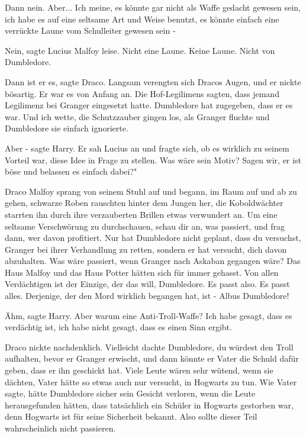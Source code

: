 \glqq Dann nein. Aber... Ich meine, es könnte gar nicht als Waffe gedacht
gewesen sein, ich habe es auf eine seltsame Art und Weise benutzt, es könnte
einfach eine verrückte Laune vom Schulleiter gewesen sein -\grqq{}

\glqq Nein\grqq{}, sagte Lucius Malfoy leise. \glqq Nicht eine Laune. Keine
Laune. Nicht von Dumbledore.\grqq{}

\glqq Dann ist er es\grqq{}, sagte Draco. Langsam verengten sich Dracos Augen,
und er nickte bösartig. \glqq Er war es von Anfang an. Die Hof-Legilimens
sagten, dass jemand Legilimenz bei Granger eingesetzt hatte. Dumbledore hat
zugegeben, dass er es war. Und ich wette, die Schutzzauber gingen los, als
Granger fluchte und Dumbledore sie einfach ignorierte.\grqq{}

\glqq Aber -\grqq{} sagte Harry. Er sah Lucius an und fragte sich, ob es
wirklich zu seinem Vorteil war, diese Idee in Frage zu stellen. \glqq Was wäre
sein Motiv? Sagen wir, er ist böse und belassen es einfach dabei?"

Draco Malfoy sprang von seinem Stuhl auf und begann, im Raum auf und ab zu
gehen, schwarze Roben rauschten hinter dem Jungen her, die Koboldwächter
starrten ihn durch ihre verzauberten Brillen etwas verwundert an. \glqq Um eine
seltsame Verschwörung zu durchschauen, schau dir an, was passiert, und frag
dann, wer davon profitiert. Nur hat Dumbledore nicht geplant, dass du versuchst,
Granger bei ihrer Verhandlung zu retten, sondern er hat versucht, dich davon
abzuhalten. Was wäre passiert, wenn Granger nach Askaban gegangen wäre? Das Haus
Malfoy und das Haus Potter hätten sich für immer gehasst. Von allen Verdächtigen
ist der Einzige, der das will, Dumbledore. Es passt also. Es passt alles.
Derjenige, der den Mord wirklich begangen hat, ist - Albus Dumbledore!\grqq{}

\glqq Ähm\grqq{}, sagte Harry. \glqq Aber warum eine Anti-Troll-Waffe? Ich habe
gesagt, dass es verdächtig ist, ich habe nicht gesagt, dass es einen Sinn
ergibt.\grqq{}

Draco nickte nachdenklich. \glqq Vielleicht dachte Dumbledore, du würdest den
Troll aufhalten, bevor er Granger erwischt, und dann könnte er Vater die Schuld
dafür geben, dass er ihn geschickt hat. Viele Leute wären sehr wütend, wenn sie
dächten, Vater hätte so etwas auch nur versucht, in Hogwarts zu tun. Wie Vater
sagte, hätte Dumbledore sicher sein Gesicht verloren, wenn die Leute
herausgefunden hätten, dass tatsächlich ein Schüler in Hogwarts gestorben war,
denn Hogwarts ist für seine Sicherheit bekannt. Also sollte dieser Teil
wahrscheinlich nicht passieren.\grqq{}

